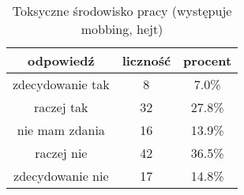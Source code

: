 \begin{table}[H]
\caption{Toksyczne środowisko pracy (występuje mobbing, hejt)}
\centering
\begin{tabular}{ | c | c | c |}
\hline
odpowiedź & liczność & procent\\
\hline
zdecydowanie tak  &  8  & 7.0\% \\
\hline
raczej tak  &  32  & 27.8\% \\
\hline
nie mam zdania  &  16  & 13.9\% \\
\hline
raczej nie  &  42  & 36.5\% \\
\hline
zdecydowanie nie  &  17  & 14.8\% \\
\hline
\end{tabular}
\label{tab:Q8}
\end{table}
